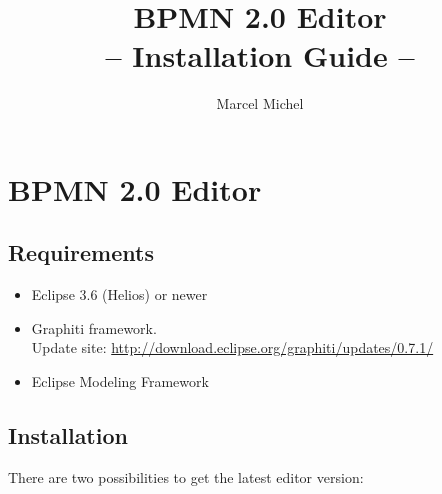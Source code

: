 \documentclass[a4paper]{scrreprt}
\begin{document}
\title{BPMN 2.0 Editor\\-- Installation Guide --}
\author{Marcel Michel}

\maketitle


\chapter{BPMN 2.0 Editor}

\section{Requirements}
\begin{itemize}
	\item Eclipse 3.6 (Helios) or newer
	\item Graphiti framework. \\Update site: \url{http://download.eclipse.org/graphiti/updates/0.7.1/}
	\item Eclipse Modeling Framework
\end{itemize}

\section{Installation}
There are two possibilities to get the latest editor version:
\end{document}
